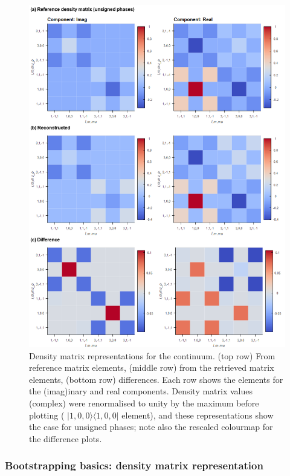 \documentclass[10pt]{article}
\begin{document}
\begin{figure}[]
\begin{center}
\includegraphics[width=\textwidth,height=\dimexpr\textheight-4\baselineskip-\abovecaptionskip-\belowcaptionskip\relax,keepaspectratio]{figures/dataDump_1000fitTests_multiFit_noise_051021_densityNorm_max_290722_11-30-03.png}
\caption{Density matrix representations for the continuum. (top row) From reference matrix elements, (middle row) from the retrieved matrix elements, (bottom row) differences. Each row shows the elements for the (imag)inary and real components. Density matrix values (complex) were renormalised to unity by the maximum before plotting ( \(|1,0,0\rangle \langle1,0,0|\) element), and these representations show the case for unsigned phases; note also the rescaled colourmap for the difference plots.\label{998904}}
\end{center}
\end{figure}

\subsubsection{Bootstrapping basics: density matrix representation\label{sec:den-mat-N2}}
\end{document}
